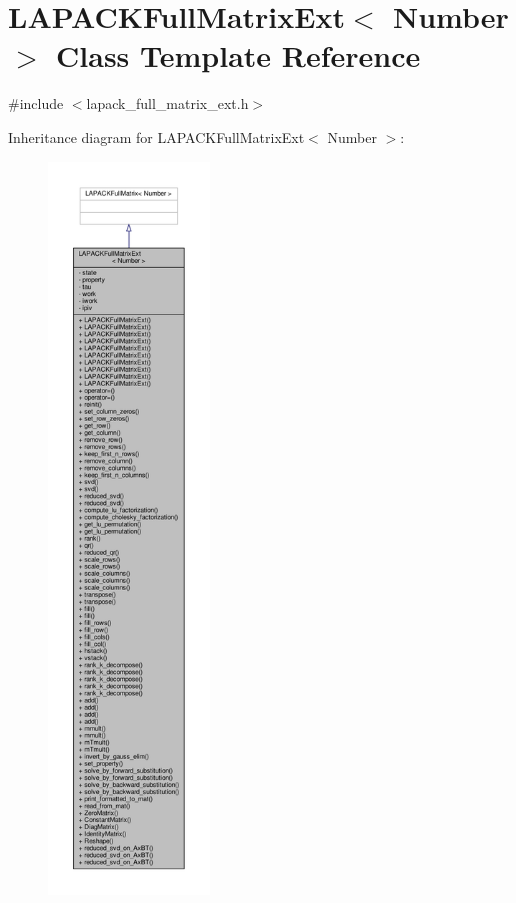 \hypertarget{classLAPACKFullMatrixExt}{}\section{L\+A\+P\+A\+C\+K\+Full\+Matrix\+Ext$<$ Number $>$ Class Template Reference}
\label{classLAPACKFullMatrixExt}


{\ttfamily \#include $<$lapack\+\_\+full\+\_\+matrix\+\_\+ext.\+h$>$}



Inheritance diagram for L\+A\+P\+A\+C\+K\+Full\+Matrix\+Ext$<$ Number $>$\+:\nopagebreak
\begin{figure}[H]
\begin{center}
\leavevmode
\includegraphics[height=550pt]{classLAPACKFullMatrixExt__inherit__graph}
\end{center}
\end{figure}


